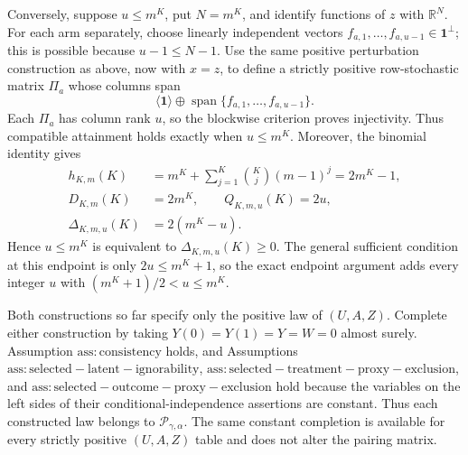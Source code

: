 Conversely, suppose \(u\le m^K\), put \(N=m^K\), and identify functions of \(z\) with \(\mathbb R^N\). For each arm separately, choose linearly independent vectors \(f_{a,1},\ldots,f_{a,u-1}\in\mathbf 1^\perp\); this is possible because \(u-1\le N-1\). Use the same positive perturbation construction as above, now with \(x=z\), to define a strictly positive row-stochastic matrix \(\Pi_a\) whose columns span
\[\langle\mathbf 1\rangle\oplus\operatorname{span}\{f_{a,1},\ldots,f_{a,u-1}\}.\]
Each \(\Pi_a\) has column rank \(u\), so the blockwise criterion proves injectivity. Thus compatible attainment holds exactly when \(u\le m^K\). Moreover, the binomial identity gives
\[\begin{aligned}h_{K,m}(K)&=m^K+\sum_{j=1}^K\binom Kj(m-1)^j=2m^K-1,\\D_{K,m}(K)&=2m^K,\qquad Q_{K,m,u}(K)=2u,\\\Delta_{K,m,u}(K)&=2(m^K-u).\end{aligned}\]
Hence \(u\le m^K\) is equivalent to \(\Delta_{K,m,u}(K)\ge0\). The general sufficient condition at this endpoint is only \(2u\le m^K+1\), so the exact endpoint argument adds every integer \(u\) with \((m^K+1)/2<u\le m^K\).

Both constructions so far specify only the positive law of \((U,A,Z)\). Complete either construction by taking \(Y(0)=Y(1)=Y=W=0\) almost surely. Assumption \(\mathrm{ass:consistency}\) holds, and Assumptions \(\mathrm{ass:selected-latent-ignorability}\), \(\mathrm{ass:selected-treatment-proxy-exclusion}\), and \(\mathrm{ass:selected-outcome-proxy-exclusion}\) hold because the variables on the left sides of their conditional-independence assertions are constant. Thus each constructed law belongs to \(\mathcal P_{\gamma,\alpha}\). The same constant completion is available for every strictly positive \((U,A,Z)\) table and does not alter the pairing matrix.

